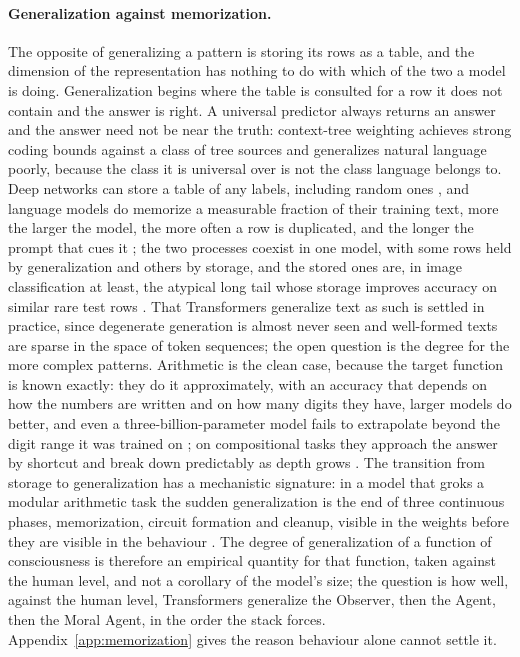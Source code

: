 \paragraph{Generalization against memorization.}
The opposite of generalizing a pattern is storing its rows as a table, and the dimension of the
representation has nothing to do with which of the two a model is doing. Generalization begins where
the table is consulted for a row it does not contain and the answer is right. A universal predictor
always returns an answer and the answer need not be near the truth: context-tree weighting achieves
strong coding bounds against a class of tree sources \citep{willems1995} and generalizes natural
language poorly, because the class it is universal over is not the class language belongs to. Deep
networks can store a table of any labels, including random ones \citep{zhang2017}, and language
models do memorize a measurable fraction of their training text, more the larger the model, the more
often a row is duplicated, and the longer the prompt that cues it \citep{carlini2023}; the two
processes coexist in one model, with some rows held by generalization and others by storage, and the
stored ones are, in image classification at least, the atypical long tail whose storage improves
accuracy on similar rare test rows \citep{feldman2020}. That Transformers generalize text as such is
settled in practice, since degenerate generation is almost never seen and well-formed texts are sparse
in the space of token sequences; the open question is the degree for the more complex patterns.
Arithmetic is the clean case, because the target function is known exactly: they do it approximately,
with an accuracy that depends on how the numbers are written and on how many digits they have, larger
models do better, and even a three-billion-parameter model fails to extrapolate beyond the digit range
it was trained on \citep{nogueira2021}; on compositional tasks they approach the answer by shortcut
and break down predictably as depth grows \citep{dziri2023}. The transition from storage to
generalization has a mechanistic signature: in a model that groks a modular arithmetic task the
sudden generalization is the end of three continuous phases, memorization, circuit formation and
cleanup, visible in the weights before they are visible in the behaviour \citep{nanda2023}. The degree
of generalization of a function of consciousness is therefore an empirical quantity for that
function, taken against the human level, and not a corollary of the model's size; the question is how
well, against the human level, Transformers generalize the Observer, then the Agent, then the Moral
Agent, in the order the stack forces. Appendix~\ref{app:memorization} gives the reason behaviour alone
cannot settle it.

